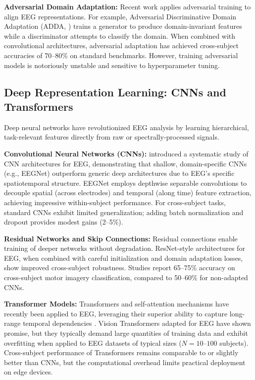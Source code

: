 \documentclass[11pt]{article}
\begin{document}
\textbf{Adversarial Domain Adaptation:} Recent work applies adversarial training to align EEG representations. For example, Adversarial Discriminative Domain Adaptation (ADDA, \citet{tzeng2017adversarial}) trains a generator to produce domain-invariant features while a discriminator attempts to classify the domain. When combined with convolutional architectures, adversarial adaptation has achieved cross-subject accuracies of 70--80\% on standard benchmarks. However, training adversarial models is notoriously unstable and sensitive to hyperparameter tuning.

\subsection{Deep Representation Learning: CNNs and Transformers}

Deep neural networks have revolutionized EEG analysis by learning hierarchical, task-relevant features directly from raw or spectrally-processed signals.

\textbf{Convolutional Neural Networks (CNNs):} \citet{schirrmeister2017deep} introduced a systematic study of CNN architectures for EEG, demonstrating that shallow, domain-specific CNNs (e.g., EEGNet) outperform generic deep architectures due to EEG's specific spatiotemporal structure. EEGNet employs depthwise separable convolutions to decouple spatial (across electrodes) and temporal (along time) feature extraction, achieving impressive within-subject performance. For cross-subject tasks, standard CNNs exhibit limited generalization; adding batch normalization and dropout provides modest gains (2--5\%).

\textbf{Residual Networks and Skip Connections:} Residual connections enable training of deeper networks without degradation. ResNet-style architectures for EEG, when combined with careful initialization and domain adaptation losses, show improved cross-subject robustness. Studies report 65--75\% accuracy on cross-subject motor imagery classification, compared to 50--60\% for non-adapted CNNs.

\textbf{Transformer Models:} Transformers and self-attention mechanisms have recently been applied to EEG, leveraging their superior ability to capture long-range temporal dependencies \citep{vaswani2017attention}. Vision Transformers adapted for EEG have shown promise, but they typically demand large quantities of training data and exhibit overfitting when applied to EEG datasets of typical sizes ($N = 10\text{--}100$ subjects). Cross-subject performance of Transformers remains comparable to or slightly better than CNNs, but the computational overhead limits practical deployment on edge devices.
\end{document}
